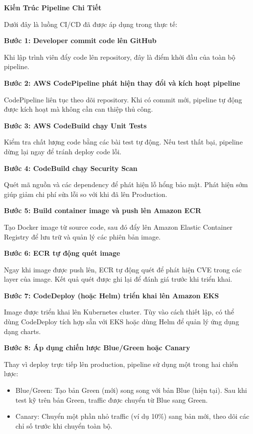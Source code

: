 \vspace{0.5em}\noindent\textbf{Kiến Trúc Pipeline Chi
Tiết}\par

Dưới đây là luồng CI/CD đã được áp dụng trong thực tế:

\textbf{Bước 1: Developer commit code lên GitHub}

Khi lập trình viên đẩy code lên repository, đây là điểm khởi đầu của
toàn bộ pipeline.

\textbf{Bước 2: AWS CodePipeline phát hiện thay đổi và kích hoạt
pipeline}

CodePipeline liên tục theo dõi repository. Khi có commit mới, pipeline
tự động được kích hoạt mà không cần can thiệp thủ công.

\textbf{Bước 3: AWS CodeBuild chạy Unit Tests}

Kiểm tra chất lượng code bằng các bài test tự động. Nếu test thất bại,
pipeline dừng lại ngay để tránh deploy code lỗi.

\textbf{Bước 4: CodeBuild chạy Security Scan}

Quét mã nguồn và các dependency để phát hiện lỗ hổng bảo mật. Phát hiện
sớm giúp giảm chi phí sửa lỗi so với khi đã lên Production.

\textbf{Bước 5: Build container image và push lên Amazon ECR}

Tạo Docker image từ source code, sau đó đẩy lên Amazon Elastic Container
Registry để lưu trữ và quản lý các phiên bản image.

\textbf{Bước 6: ECR tự động quét image}

Ngay khi image được push lên, ECR tự động quét để phát hiện CVE trong
các layer của image. Kết quả quét được ghi lại để đánh giá trước khi
triển khai.

\textbf{Bước 7: CodeDeploy (hoặc Helm) triển khai lên Amazon EKS}

Image được triển khai lên Kubernetes cluster. Tùy vào cách thiết lập, có
thể dùng CodeDeploy tích hợp sẵn với EKS hoặc dùng Helm để quản lý ứng
dụng dạng charts.

\textbf{Bước 8: Áp dụng chiến lược Blue/Green hoặc Canary}

Thay vì deploy trực tiếp lên production, pipeline sử dụng một trong hai
chiến lược:

\begin{itemize}
\tightlist
\item
  Blue/Green: Tạo bản Green (mới) song song với bản Blue (hiện tại). Sau
  khi test kỹ trên bản Green, traffic được chuyển từ Blue sang Green.
\item
  Canary: Chuyển một phần nhỏ traffic (ví dụ 10\%) sang bản mới, theo
  dõi các chỉ số trước khi chuyển toàn bộ.
\end{itemize}

